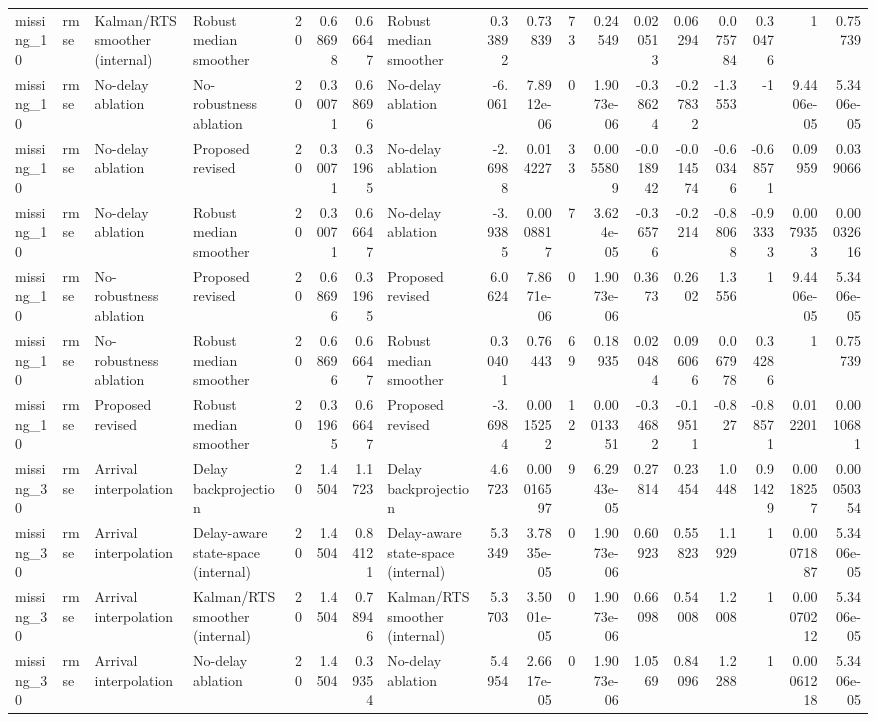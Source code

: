 \begin{table}[!htbp]
{\begin{tabular}{llllrrrlrrrrrrrrrr}
missing_10 & rmse & Kalman/RTS smoother (internal) & Robust median smoother & 20 & 0.68698 & 0.66647 & Robust median smoother & 0.33892 & 0.73839 & 73 & 0.24549 & 0.020513 & 0.06294 & 0.075784 & 0.30476 & 1 & 0.75739 \\
missing_10 & rmse & No-delay ablation & No-robustness ablation & 20 & 0.30071 & 0.68696 & No-delay ablation & -6.061 & 7.8912e-06 & 0 & 1.9073e-06 & -0.38624 & -0.27832 & -1.3553 & -1 & 9.4406e-05 & 5.3406e-05 \\
missing_10 & rmse & No-delay ablation & Proposed revised & 20 & 0.30071 & 0.31965 & No-delay ablation & -2.6988 & 0.014227 & 33 & 0.0055809 & -0.018942 & -0.014574 & -0.60346 & -0.68571 & 0.09959 & 0.039066 \\
missing_10 & rmse & No-delay ablation & Robust median smoother & 20 & 0.30071 & 0.66647 & No-delay ablation & -3.9385 & 0.0008817 & 7 & 3.624e-05 & -0.36576 & -0.2214 & -0.88068 & -0.93333 & 0.0079353 & 0.00032616 \\
missing_10 & rmse & No-robustness ablation & Proposed revised & 20 & 0.68696 & 0.31965 & Proposed revised & 6.0624 & 7.8671e-06 & 0 & 1.9073e-06 & 0.3673 & 0.2602 & 1.3556 & 1 & 9.4406e-05 & 5.3406e-05 \\
missing_10 & rmse & No-robustness ablation & Robust median smoother & 20 & 0.68696 & 0.66647 & Robust median smoother & 0.30401 & 0.76443 & 69 & 0.18935 & 0.020484 & 0.096066 & 0.067978 & 0.34286 & 1 & 0.75739 \\
missing_10 & rmse & Proposed revised & Robust median smoother & 20 & 0.31965 & 0.66647 & Proposed revised & -3.6984 & 0.0015252 & 12 & 0.00013351 & -0.34682 & -0.19511 & -0.827 & -0.88571 & 0.012201 & 0.0010681 \\
missing_30 & rmse & Arrival interpolation & Delay backprojection & 20 & 1.4504 & 1.1723 & Delay backprojection & 4.6723 & 0.00016597 & 9 & 6.2943e-05 & 0.27814 & 0.23454 & 1.0448 & 0.91429 & 0.0018257 & 0.00050354 \\
missing_30 & rmse & Arrival interpolation & Delay-aware state-space (internal) & 20 & 1.4504 & 0.84121 & Delay-aware state-space (internal) & 5.3349 & 3.7835e-05 & 0 & 1.9073e-06 & 0.60923 & 0.55823 & 1.1929 & 1 & 0.00071887 & 5.3406e-05 \\
missing_30 & rmse & Arrival interpolation & Kalman/RTS smoother (internal) & 20 & 1.4504 & 0.78946 & Kalman/RTS smoother (internal) & 5.3703 & 3.5001e-05 & 0 & 1.9073e-06 & 0.66098 & 0.54008 & 1.2008 & 1 & 0.00070212 & 5.3406e-05 \\
missing_30 & rmse & Arrival interpolation & No-delay ablation & 20 & 1.4504 & 0.39354 & No-delay ablation & 5.4954 & 2.6617e-05 & 0 & 1.9073e-06 & 1.0569 & 0.84096 & 1.2288 & 1 & 0.00061218 & 5.3406e-05 \\

\end{tabular}}
\end{table}

